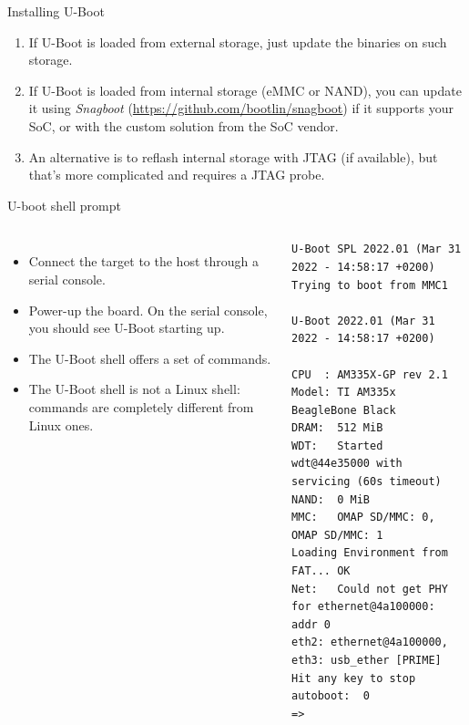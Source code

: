 \begin{frame}{Installing U-Boot}
  \begin{enumerate}
  \item If U-Boot is loaded from external storage, just update
        the binaries on such storage.
  \item If U-Boot is loaded from internal storage (eMMC or NAND),
        you can update it using {\em Snagboot}
        (\url{https://github.com/bootlin/snagboot}) if it supports
        your SoC, or with the custom solution from the SoC vendor.
  \item An alternative is to reflash internal storage with JTAG
        (if available), but that's more complicated and requires
        a JTAG probe.
  \end{enumerate}
\end{frame}

\begin{frame}[fragile]{U-boot shell prompt}
  \begin{columns}
    \begin{itemize}
    \item Connect the target to the host through a serial console.
    \item Power-up the board. On the serial console, you should
      see U-Boot starting up.
    \item The U-Boot shell offers a set of commands.
    \item The U-Boot shell is not a Linux shell: commands are
      completely different from Linux ones.
    \end{itemize}
    \begin{block}{}
      {\tiny
\begin{verbatim}
U-Boot SPL 2022.01 (Mar 31 2022 - 14:58:17 +0200)
Trying to boot from MMC1

U-Boot 2022.01 (Mar 31 2022 - 14:58:17 +0200)

CPU  : AM335X-GP rev 2.1
Model: TI AM335x BeagleBone Black
DRAM:  512 MiB
WDT:   Started wdt@44e35000 with servicing (60s timeout)
NAND:  0 MiB
MMC:   OMAP SD/MMC: 0, OMAP SD/MMC: 1
Loading Environment from FAT... OK
Net:   Could not get PHY for ethernet@4a100000: addr 0
eth2: ethernet@4a100000, eth3: usb_ether [PRIME]
Hit any key to stop autoboot:  0
=>
\end{verbatim}
      }
    \end{block}
  \end{columns}
\end{frame}

